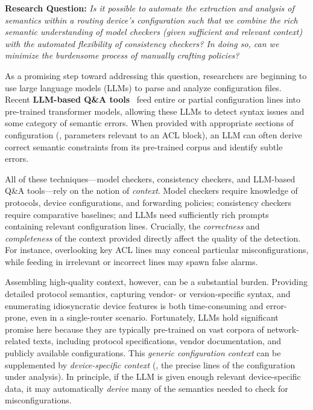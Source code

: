\smallskip
\noindent
\textbf{Research Question:}
\emph{Is it possible to automate the extraction and analysis of \emph{semantics}
	within a routing device’s configuration such that we combine the rich
	semantic understanding of model checkers (given sufficient and relevant
	context) with the automated flexibility of consistency checkers? In doing so,
	can we minimize the burdensome process of manually crafting policies?}

\smallskip

As a promising step toward addressing this question, researchers are beginning
to use large language models (LLMs) to parse and analyze configuration files.
Recent \textbf{LLM-based Q\&A
	tools}~\cite{bogdanov2024leveraging,chen2024automatic,wang2024identifying,liu2024large,
	wang2024netconfeval, lian2023configuration} feed entire or partial
configuration lines into pre-trained transformer models, allowing these LLMs
to detect syntax issues and some category of semantic errors. When provided
with appropriate sections of configuration (\eg, parameters relevant to an ACL
block), an LLM can often derive correct semantic constraints from its
pre-trained corpus and identify subtle errors.

All of these techniques—model checkers, consistency checkers, and LLM-based
Q\&A tools—rely on the notion of \emph{context}. Model checkers require
knowledge of protocols, device configurations, and forwarding policies;
consistency checkers require comparative baselines; and LLMs need sufficiently
rich prompts containing relevant configuration lines. Crucially, the
\emph{correctness} and \emph{completeness} of the context provided directly
affect the quality of the detection. For instance, overlooking key ACL lines
may conceal particular misconfigurations, while feeding in irrelevant or
incorrect lines may spawn false alarms.

Assembling high-quality context, however, can be a substantial burden.
Providing detailed protocol semantics, capturing vendor- or version-specific
syntax, and enumerating idiosyncratic device features is both time-consuming
and error-prone, even in a single-router scenario. Fortunately, LLMs hold
significant promise here because they are typically pre-trained on vast
corpora of network-related texts, including protocol specifications, vendor
documentation, and publicly available configurations. This \emph{generic
	configuration context} can be supplemented by \emph{device-specific context}
(\ie, the precise lines of the configuration under analysis). In principle, if
the LLM is given enough relevant device-specific data, it may automatically
\emph{derive} many of the semantics needed to check for misconfigurations.

